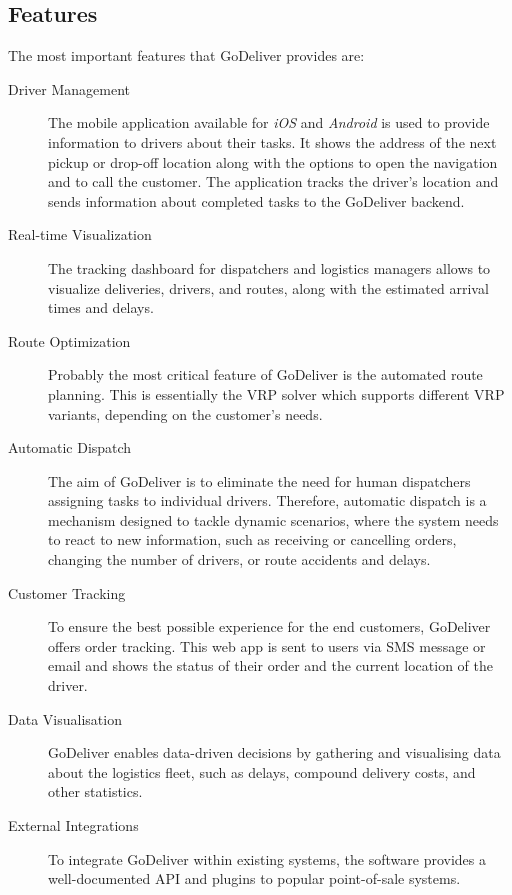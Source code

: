     \subsection{Features}

    	The most important features that GoDeliver provides are:
    	\begin{description}
    		
    		\item [Driver Management] The mobile application available for \emph{iOS} and \emph{Android} is used to provide information to drivers about their tasks. It shows the address of the next pickup or drop-off location along with the options to open the navigation and to call the customer. The application tracks the driver's location and sends information about completed tasks to the GoDeliver backend.
    		
    		\item [Real-time Visualization] The tracking dashboard for dispatchers and logistics managers allows to visualize deliveries, drivers, and routes, along with the estimated arrival times and delays.
    		
    		\item [Route Optimization] Probably the most critical feature of GoDeliver is the automated route planning. This is essentially the VRP solver which supports different VRP variants, depending on the customer's needs.
    		
    		\item [Automatic Dispatch] The aim of GoDeliver is to eliminate the need for human dispatchers assigning tasks to individual drivers. Therefore, automatic dispatch is a mechanism designed to tackle dynamic scenarios, where the system needs to react to new information, such as receiving or cancelling orders, changing the number of drivers, or route accidents and delays.
    	
    		\item [Customer Tracking] To ensure the best possible experience for the end customers, GoDeliver offers order tracking. This web app is sent to users via SMS message or email and shows the status of their order and the current location of the driver.
    		
    		\item [Data Visualisation] GoDeliver enables data-driven decisions by gathering and visualising data about the logistics fleet, such as delays, compound delivery costs, and other statistics.
    		
    		\item [External Integrations] To integrate GoDeliver within existing systems, the software provides a well-documented API and plugins to popular point-of-sale systems.
            
    	\end{description}


